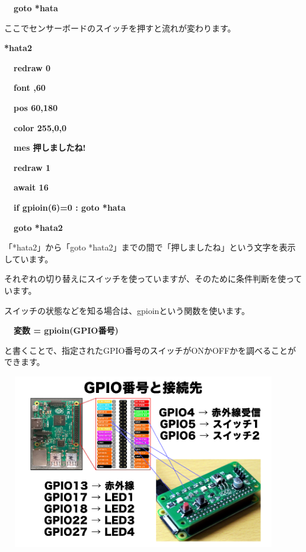 \documentclass[a4paper,12pt]{jarticle}
\begin{document}
{\bfseries
\ \ goto *hata}


\bigskip

ここでセンサーボードのスイッチを押すと流れが変わります。


\bigskip

{\bfseries
*hata2}

{\bfseries
\ \ redraw 0}

{\bfseries
\ \ font {\textquotedbl}{\textquotedbl},60}

{\bfseries
\ \ pos 60,180}

{\bfseries
\ \ color 255,0,0}

{\bfseries
\ \ mes {\textquotedbl}押しましたね!{\textquotedbl}}

{\bfseries
\ \ redraw 1}

{\bfseries
\ \ await 16}

{\bfseries
\ \ if gpioin(6)=0 : goto *hata}

{\bfseries
\ \ goto *hata2}


\bigskip

「*hata2」から「goto *hata2」までの間で「押しましたね」という文字を表示しています。

それぞれの切り替えにスイッチを使っていますが、そのために条件判断を使っています。

スイッチの状態などを知る場合は、gpioinという関数を使います。


\bigskip

{\bfseries
\ \ 変数 = gpioin(GPIO番号)}

\bigskip

と書くことで、指定されたGPIO番号のスイッチがONかOFFかを調べることができます。


\bigskip
\bigskip

\begin{minipage}{9.781cm}
\centering
{\upshape
\includegraphics[keepaspectratio,width=12.409cm,height=7.62cm]{text04-img/text04-img004.png}}
\end{minipage}
\end{document}

